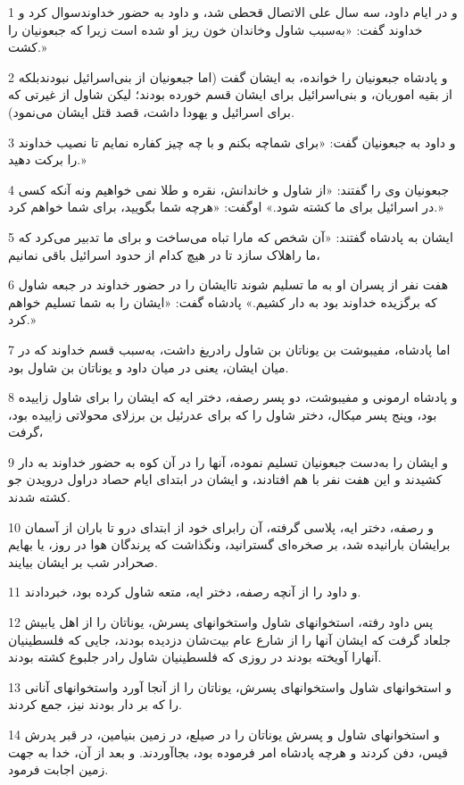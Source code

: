 \par 1 و در ایام داود، سه سال علی الاتصال قحطی شد، و داود به حضور خداوندسوال کرد و خداوند گفت: «به‌سبب شاول وخاندان خون ریز او شده است زیرا که جبعونیان را کشت.»
\par 2 و پادشاه جبعونیان را خوانده، به ایشان گفت (اما جبعونیان از بنی‌اسرائیل نبودندبلکه از بقیه اموریان، و بنی‌اسرائیل برای ایشان قسم خورده بودند؛ لیکن شاول از غیرتی که برای اسرائیل و یهودا داشت، قصد قتل ایشان می‌نمود).
\par 3 و داود به جبعونیان گفت: «برای شماچه بکنم و با چه چیز کفاره نمایم تا نصیب خداوند را برکت دهید.»
\par 4 جبعونیان وی را گفتند: «از شاول و خاندانش، نقره و طلا نمی خواهیم ونه آنکه کسی در اسرائیل برای ما کشته شود.» اوگفت: «هر‌چه شما بگویید، برای شما خواهم کرد.»
\par 5 ایشان به پادشاه گفتند: «آن شخص که مارا تباه می‌ساخت و برای ما تدبیر می‌کرد که ما راهلاک سازد تا در هیچ کدام از حدود اسرائیل باقی نمانیم،
\par 6 هفت نفر از پسران او به ما تسلیم شوند تاایشان را در حضور خداوند در جبعه شاول که برگزیده خداوند بود به دار کشیم.» پادشاه گفت: «ایشان را به شما تسلیم خواهم کرد.»
\par 7 اما پادشاه، مفیبوشت بن یوناتان بن شاول رادریغ داشت، به‌سبب قسم خداوند که در میان ایشان، یعنی در میان داود و یوناتان بن شاول بود.
\par 8 و پادشاه ارمونی و مفیبوشت، دو پسر رصفه، دختر ایه که ایشان را برای شاول زاییده بود، وپنج پسر میکال، دختر شاول را که برای عدرئیل بن برزلای محولاتی زاییده بود، گرفت،
\par 9 و ایشان را به‌دست جبعونیان تسلیم نموده، آنها را در آن کوه به حضور خداوند به دار کشیدند و این هفت نفر با هم افتادند، و ایشان در ابتدای ایام حصاد دراول درویدن جو کشته شدند.
\par 10 و رصفه، دختر ایه، پلاسی گرفته، آن رابرای خود از ابتدای درو تا باران از آسمان برایشان بارانیده شد، بر صخره‌ای گسترانید، ونگذاشت که پرندگان هوا در روز، یا بهایم صحرادر شب بر ایشان بیایند.
\par 11 و داود را از آنچه رصفه، دختر ایه، متعه شاول کرده بود، خبردادند.
\par 12 پس داود رفته، استخوانهای شاول واستخوانهای پسرش، یوناتان را از اهل یابیش جلعاد گرفت که ایشان آنها را از شارع عام بیت‌شان دزدیده بودند، جایی که فلسطینیان آنهارا آویخته بودند در روزی که فلسطینیان شاول رادر جلبوع کشته بودند.
\par 13 و استخوانهای شاول واستخوانهای پسرش، یوناتان را از آنجا آورد واستخوانهای آنانی را که بر دار بودند نیز، جمع کردند.
\par 14 و استخوانهای شاول و پسرش یوناتان را در صیلع، در زمین بنیامین، در قبر پدرش قیس، دفن کردند و هرچه پادشاه امر فرموده بود، بجاآوردند. و بعد از آن، خدا به جهت زمین اجابت فرمود.
